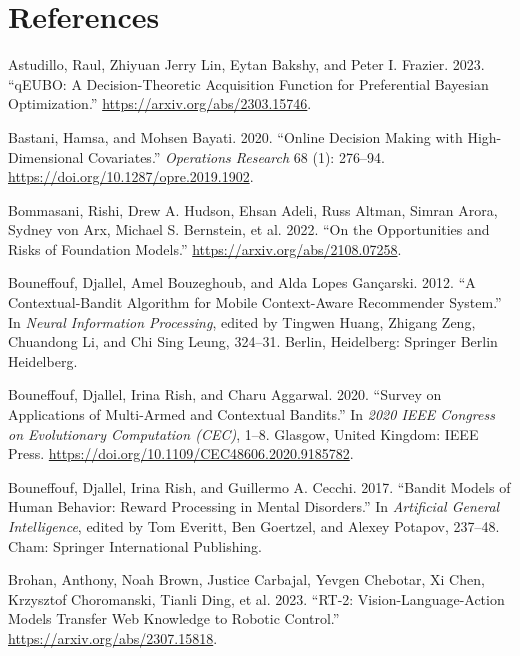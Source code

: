\documentclass[
  letterpaper,
  numbers=noenddot,
  DIV=11]{scrreprt}
\newlength{\cslhangindent}
\newenvironment{CSLReferences}[2] %
 {\begin{list}{}{%
  \setlength{\itemindent}{0pt}
  \setlength{\leftmargin}{0pt}
  \setlength{\parsep}{0pt}
  \ifodd #1
   \setlength{\leftmargin}{\cslhangindent}
   \setlength{\itemindent}{-1\cslhangindent}
  \fi
  \setlength{\itemsep}{#2\baselineskip}}}
 {\end{list}}
\theoremstyle{plain}
\theoremstyle{definition}
\theoremstyle{remark}
\begin{document}
\section*{References}\label{bibliography-5}


\label{refs-5}
\begin{CSLReferences}{1}{0}
Astudillo, Raul, Zhiyuan Jerry Lin, Eytan Bakshy, and Peter I. Frazier.
2023. {``qEUBO: A Decision-Theoretic Acquisition Function for
Preferential Bayesian Optimization.''}
\url{https://arxiv.org/abs/2303.15746}.

Bastani, Hamsa, and Mohsen Bayati. 2020. {``Online Decision Making with
High-Dimensional Covariates.''} \emph{Operations Research} 68 (1):
276--94. \url{https://doi.org/10.1287/opre.2019.1902}.

Bommasani, Rishi, Drew A. Hudson, Ehsan Adeli, Russ Altman, Simran
Arora, Sydney von Arx, Michael S. Bernstein, et al. 2022. {``On the
Opportunities and Risks of Foundation Models.''}
\url{https://arxiv.org/abs/2108.07258}.

Bouneffouf, Djallel, Amel Bouzeghoub, and Alda Lopes Gançarski. 2012.
{``A Contextual-Bandit Algorithm for Mobile Context-Aware Recommender
System.''} In \emph{Neural Information Processing}, edited by Tingwen
Huang, Zhigang Zeng, Chuandong Li, and Chi Sing Leung, 324--31. Berlin,
Heidelberg: Springer Berlin Heidelberg.

Bouneffouf, Djallel, Irina Rish, and Charu Aggarwal. 2020. {``Survey on
Applications of Multi-Armed and Contextual Bandits.''} In \emph{2020
IEEE Congress on Evolutionary Computation (CEC)}, 1--8. Glasgow, United
Kingdom: IEEE Press.
\url{https://doi.org/10.1109/CEC48606.2020.9185782}.

Bouneffouf, Djallel, Irina Rish, and Guillermo A. Cecchi. 2017.
{``Bandit Models of Human Behavior: Reward Processing in Mental
Disorders.''} In \emph{Artificial General Intelligence}, edited by Tom
Everitt, Ben Goertzel, and Alexey Potapov, 237--48. Cham: Springer
International Publishing.

Brohan, Anthony, Noah Brown, Justice Carbajal, Yevgen Chebotar, Xi Chen,
Krzysztof Choromanski, Tianli Ding, et al. 2023. {``RT-2:
Vision-Language-Action Models Transfer Web Knowledge to Robotic
Control.''} \url{https://arxiv.org/abs/2307.15818}.


\end{CSLReferences}
\end{document}
